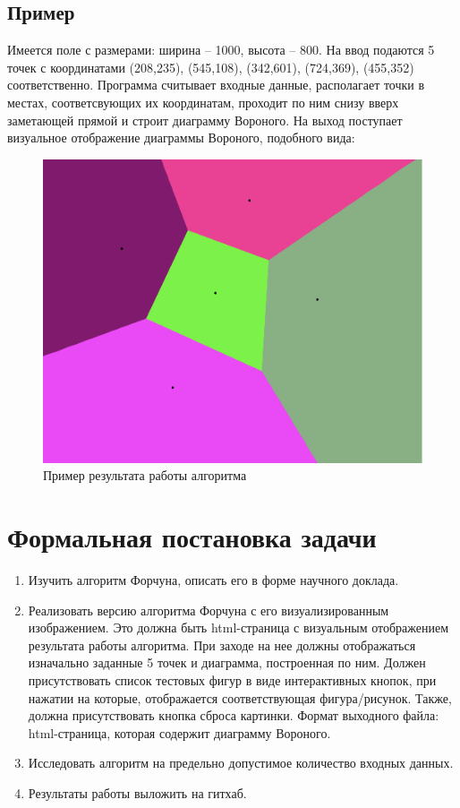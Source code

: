 \subsection{Пример}
Имеется поле с размерами: ширина – 1000, высота – 800. 
На ввод подаются 5 точек с координатами (208,235), (545,108), (342,601), (724,369), (455,352) соответственно. Программа считывает входные данные, располагает точки в местах, соответсвующих их координатам, проходит по ним снизу вверх заметающей прямой и строит диаграмму Вороного. На выход поступает визуальное отображение диаграммы Вороного, подобного вида:\\
\begin{figure}[H]
\centering
\includegraphics[scale = 0.4]{Диаграмма для задачи}
\caption{\label{tab:widgets}Пример результата работы алгоритма}

\end{figure}

\clearpage
\section{Формальная постановка задачи}
\begin{enumerate}
\item Изучить алгоритм Форчуна, описать его в форме научного доклада.
\item Реализовать версию алгоритма Форчуна с его визуализированным изображением. Это должна быть html-страница с визуальным отображением результата работы алгоритма. При заходе на нее должны отображаться изначально заданные 5 точек и диаграмма, построенная по ним. Должен присутствовать список тестовых фигур в виде интерактивных кнопок, при нажатии на которые, отображается соответствующая фигура/рисунок. Также, должна присутствовать кнопка сброса картинки. 
		  Формат выходного файла: html-страница, которая содержит диаграмму Вороного.
\item Исследовать алгоритм на предельно допустимое количество входных данных.
\item Результаты работы выложить на гитхаб.
\end{enumerate}

